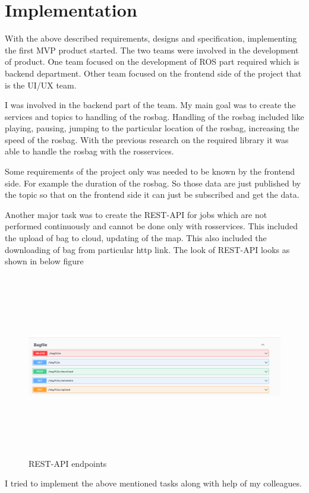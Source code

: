 \chapter{Implementation}

With the above described requirements, designs and specification, implementing the first MVP product started. The two teams were involved in the  development of product. One team focused on the development of ROS part required which is backend department. Other team focused on the frontend side of the project that is the UI/UX team. 

I was involved in the backend part of the team. My main goal was to create the services and topics to handling of the rosbag. Handling of the rosbag included like playing, pausing, jumping to the particular location of the rosbag, increasing the speed of the rosbag. With the previous research on the required library it was able to handle the rosbag with the rosservices. 

Some requirements of the project only was needed to be known by the frontend side. For example the duration of the rosbag. So those data are just published by the topic so that on the frontend side it can just be subscribed and get the data. 

Another major task was to create the REST-API for jobs which are not performed continuously and cannot be done only with rosservices. This included the upload of bag to cloud, updating of the map. This also included the downloading of bag from particular http link. The look of REST-API looks as shown in below figure
\begin{figure}[h]
	\begin{center}
		\includegraphics[height=8cm,width=\linewidth]{images/rest-api.png}
		\caption{REST-API endpoints}
	\end{center}
\end{figure}
I tried to implement the above mentioned tasks along with help of my colleagues.
 
